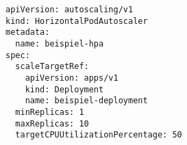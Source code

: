 \begin{verbatim}
apiVersion: autoscaling/v1
kind: HorizontalPodAutoscaler
metadata:
  name: beispiel-hpa
spec:
  scaleTargetRef:
    apiVersion: apps/v1
    kind: Deployment
    name: beispiel-deployment
  minReplicas: 1
  maxReplicas: 10
  targetCPUUtilizationPercentage: 50
\end{verbatim}
